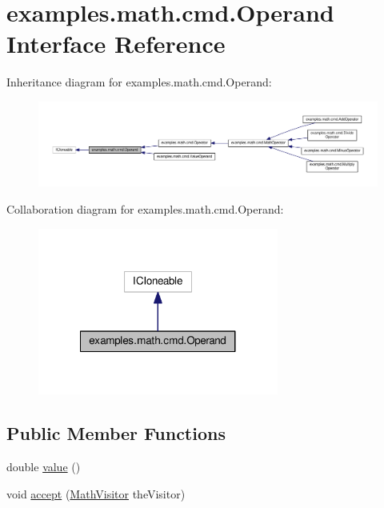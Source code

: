 \hypertarget{interfaceexamples_1_1math_1_1cmd_1_1_operand}{\section{examples.\-math.\-cmd.\-Operand Interface Reference}
\label{interfaceexamples_1_1math_1_1cmd_1_1_operand}
}


Inheritance diagram for examples.\-math.\-cmd.\-Operand\-:
\nopagebreak
\begin{figure}[H]
\begin{center}
\leavevmode
\includegraphics[width=350pt]{interfaceexamples_1_1math_1_1cmd_1_1_operand__inherit__graph}
\end{center}
\end{figure}


Collaboration diagram for examples.\-math.\-cmd.\-Operand\-:
\nopagebreak
\begin{figure}[H]
\begin{center}
\leavevmode
\includegraphics[width=224pt]{interfaceexamples_1_1math_1_1cmd_1_1_operand__coll__graph}
\end{center}
\end{figure}
\subsection*{Public Member Functions}
\begin{DoxyCompactItemize}
\item 
double \hyperlink{interfaceexamples_1_1math_1_1cmd_1_1_operand_aa5af74a515a1ecbd6cad1ecd1e618064}{value} ()
\item 
void \hyperlink{interfaceexamples_1_1math_1_1cmd_1_1_operand_aaadf6877856130d245dbb5a3a6993ef6}{accept} (\hyperlink{interfaceexamples_1_1math_1_1_math_visitor}{Math\-Visitor} the\-Visitor)
\end{DoxyCompactItemize}
